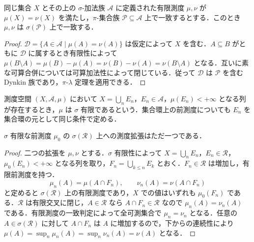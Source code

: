 \begin{prop}[有限測度の一致判定]
同じ集合 $X$ とその上の $\sigma$-加法族 $\mathcal A$ に定義された有限測度 $\mu,\nu$ が $\mu(X)=\nu(X)$ を満たし，$\pi$-集合族 $\mathcal P\subseteq\mathcal A$ 上で一致するとする．このとき $\mu,\nu$ は $\sigma(\mathcal P)$ 上で一致する．
\end{prop}
\begin{proof}
$\mathcal D=\{A\in\mathcal A\mid\mu(A)=\nu(A)\}$ は仮定によって $X$ を含む．$A\subseteq B$ がともに $\mathcal D$ に属するとき有限性によって $\mu(B\setminus A)=\mu(B)-\mu(A)=\nu(B)-\nu(A)=\nu(B\setminus A)$ となる．互いに素な可算合併については可算加法性によって閉じている．従って $\mathcal D$ は $\mathcal P$ を含む Dynkin 族であり，$\pi$-$\lambda$ 定理を適用できる．
\end{proof}
\begin{defn}[σ有限性]
測度空間 $(X,\mathcal A,\mu)$ において $X=\bigcup_n E_n$，$E_n\in\mathcal A$，$\mu(E_n)<+\infty$ となる列が存在するとき，$\mu$ は $\sigma$ 有限であるという．集合環上の前測度についても $E_n$ を集合環の元として同じ条件で定める．
\end{defn}
\begin{prop}[σ有限前測度の拡張の一意性]
$\sigma$ 有限な前測度 $\mu_0$ の $\sigma(\mathcal R)$ 上への測度拡張はただ一つである．
\end{prop}
\begin{proof}
二つの拡張を $\mu,\nu$ とする．$\sigma$ 有限性によって $X=\bigcup_n E_n$，$E_n\in\mathcal R$，$\mu_0(E_n)<+\infty$ となる列を取り，$F_n=\bigcup_{k\leq n}E_k$ とおく．$F_n\in\mathcal R$ は増加し，有限前測度を持つ．
\[
 \mu_n(A)=\mu(A\cap F_n),\qquad \nu_n(A)=\nu(A\cap F_n)
\]
と定めると $\sigma(\mathcal R)$ 上の有限測度であり，$X$ での値はいずれも $\mu_0(F_n)$ である．$\mathcal R$ は有限交叉に閉じ，$A\in\mathcal R$ なら $A\cap F_n\in\mathcal R$ なので $\mu_n(A)=\nu_n(A)$ である．有限測度の一致判定によって全可測集合で $\mu_n=\nu_n$ となる．任意の $A\in\sigma(\mathcal R)$ に対して $A\cap F_n$ は $A$ に増加するので，下からの連続性により $\mu(A)=\sup_n\mu_n(A)=\sup_n\nu_n(A)=\nu(A)$ となる．
\end{proof}
